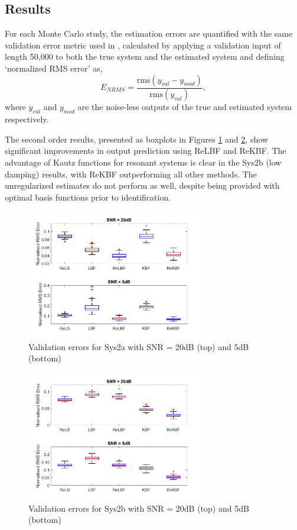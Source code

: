 \subsection{Results}

For each Monte Carlo study, the estimation errors are quantified with the same validation error metric used in \cite{Birpoutsoukis2017}, calculated by applying a validation input of length 50,000 to both the true system and the estimated system and defining `normalized RMS error' as,
\begin{equation}
E_{NRMS} = \frac{\textrm{rms}(y_{val}-y_{mod})}{\textrm{rms}(y_{val})},
\end{equation}
where $y_{val}$ and $y_{mod}$ are the noise-less outputs of the true and estimated system respectively. 

The second order results, presented as boxplots in Figures \ref{Sys2a_Val} and \ref{Sys2b_Val}, show significant improvements in output prediction using ReLBF and ReKBF. The advantage of Kautz functions for resonant systems is clear in the Sys2b (low damping) results, with ReKBF outperforming all other methods. The unregularized estimates do not perform as well, despite being provided with optimal basis functions prior to identification.

\begin{figure}[!h]
\centering
\includegraphics[width = 0.7\textwidth]{Chapter5_RegBFs/Georgios_2ndOrder.pdf}
\caption{Validation errors for Sys2a with SNR = 20dB (top) and 5dB (bottom)}
\label{Sys2a_Val}
\end{figure}

\begin{figure}[!h]
\centering
\includegraphics[width = 0.7\textwidth]{Chapter5_RegBFs/Resonant_2ndOrder.pdf}
\caption{Validation errors for Sys2b with SNR = 20dB (top) and 5dB (bottom)}
\label{Sys2b_Val}
\end{figure}

